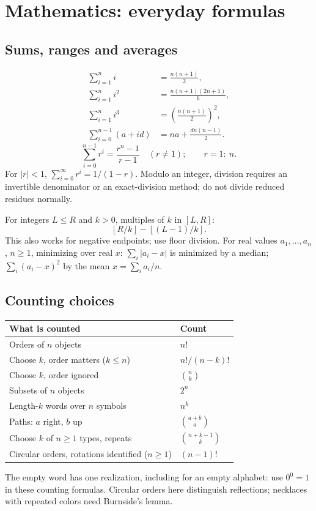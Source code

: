 \section{Mathematics: everyday formulas}\label{math:basics}
\subsection{Sums, ranges and averages}
\[
\begin{aligned}
 \sum_{i=1}^{n}i&=\frac{n(n+1)}2,\\
 \sum_{i=1}^{n}i^2&=\frac{n(n+1)(2n+1)}6,\\
 \sum_{i=1}^{n}i^3&=\left(\frac{n(n+1)}2\right)^2,\\
 \sum_{i=0}^{n-1}(a+id)&=na+\frac{dn(n-1)}2.
\end{aligned}
\]
\[
 \sum_{i=0}^{n-1}r^i=\frac{r^n-1}{r-1}\quad(r\ne1);
 \qquad r=1:\ n.
\]
For $|r|<1$, $\sum_{i=0}^{\infty}r^i=1/(1-r)$.
Modulo an integer, division requires an invertible denominator
or an exact-division method; do not divide reduced residues normally.

For integers $L\le R$ and $k>0$, multiples of $k$ in $[L,R]$:
\[
 \left\lfloor R/k\right\rfloor-
 \left\lfloor(L-1)/k\right\rfloor.
\]
This also works for negative endpoints; use floor division.
For real values $a_1,\ldots,a_n$, $n\ge1$, minimizing over real $x$:
$\sum_i|a_i-x|$ is minimized by a median;
$\sum_i(a_i-x)^2$ by the mean $x=\sum_i a_i/n$.

\subsection{Counting choices}\label{math:counting}
\begin{tabularx}{\linewidth}{@{}Xl@{}}
\toprule
What is counted & Count\\
\midrule
Orders of $n$ objects & $n!$\\
Choose $k$, order matters ($k\le n$) & $n!/(n-k)!$\\
Choose $k$, order ignored & $\binom nk$\\
Subsets of $n$ objects & $2^n$\\
Length-$k$ words over $n$ symbols & $n^k$\\
Paths: $a$ right, $b$ up & $\binom{a+b}{a}$\\
Choose $k$ of $n\ge1$ types, repeats & $\binom{n+k-1}{k}$\\
Circular orders, rotations identified ($n\ge1$) & $(n-1)!$\\
\bottomrule
\end{tabularx}
The empty word has one realization, including for an empty alphabet:
use $0^0=1$ in these counting formulas. Circular orders here distinguish
reflections; necklaces with repeated colors need Burnside's lemma.

